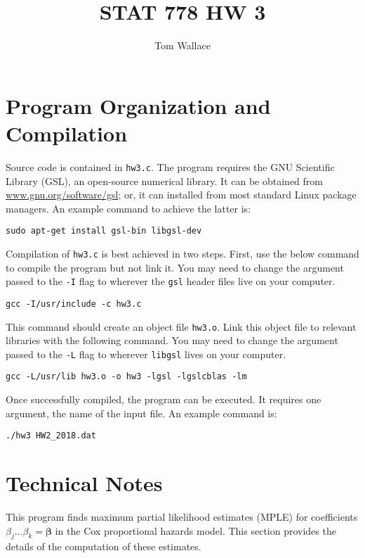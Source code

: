 \documentclass{article}
\author{Tom Wallace}
\title{STAT 778 HW 3}
\begin{document}
\maketitle

\section*{Program Organization and Compilation}

Source code is contained in \texttt{hw3.c}. 
The program requires the GNU Scientific Library (GSL), an
open-source numerical library. It can be obtained from
\url{www.gnu.org/software/gsl}; or, it can installed from most standard Linux
package managers. An example command to achieve the latter is:

\begin{center}
	\texttt{sudo apt-get install gsl-bin libgsl-dev}
\end{center}

Compilation of \texttt{hw3.c} is best achieved in two steps. First, use the below
command to compile the program but not link it. You may need to change the
argument passed to the \texttt{-I} flag to wherever the \texttt{gsl} header
files live on your computer. 

\begin{center}
	\texttt{gcc -I/usr/include -c hw3.c}
\end{center}

This command should create an object file \texttt{hw3.o}. Link this 
object file to relevant libraries with the following command.
You may need to change the argument passed to the \texttt{-L} flag to
wherever \texttt{libgsl} lives on your computer.

\begin{center}
	\texttt{gcc -L/usr/lib hw3.o -o hw3 -lgsl -lgslcblas -lm}
\end{center}

Once successfully compiled, the program can be executed. It requires one
argument, the name of the input file. An example command is:

\begin{center}
	\texttt{./hw3 HW2\_2018.dat}
\end{center}

\section*{Technical Notes}

This program finds maximum partial likelihood estimates (MPLE) for coefficients
$\beta_j\ldots\beta_k=\bm{\beta}$ in the Cox proportional hazards model. This
section provides the details of the computation of these estimates.
\end{document}
